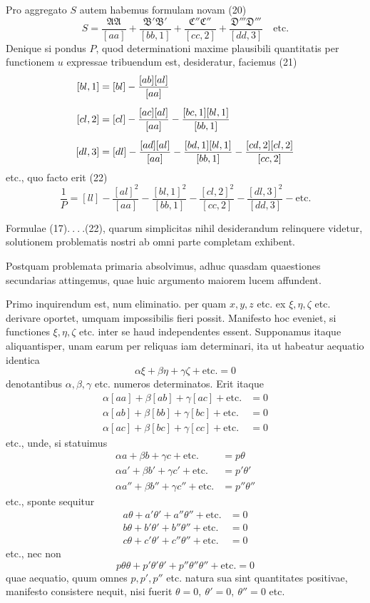 Pro aggregato \(S\) autem habemus formulam novam (20)
\[
S=\frac{\mathfrak A\mathfrak A}{[aa]}+\frac{\mathfrak B'\mathfrak B'}{[bb,1]}+\frac{\mathfrak C''\mathfrak C''}{[cc,2]}+\frac{\mathfrak D'''\mathfrak D'''}{[dd,3]}\quad\text{etc.}
\]
Denique si pondus \(P\), quod determinationi maxime plausibili quantitatis per functionem \(u\) expressae tribuendum est, desideratur, faciemus (21)
\[
\begin{aligned}\relax
[bl,1]&=[bl]-\frac{[ab][al]}{[aa]}\\[5pt]
[cl,2]&=[cl]-\frac{[ac][al]}{[aa]}-\frac{[bc,1][bl,1]}{[bb,1]}\\[5pt]
[dl,3]&=[dl]-\frac{[ad][al]}{[aa]}-\frac{[bd,1][bl,1]}{[bb,1]}-\frac{[cd,2][cl,2]}{[cc,2]}
\end{aligned}
\]
etc., quo facto erit (22)
\[
\frac1P=[ll]-\frac{[al]^2}{[aa]}-\frac{[bl,1]^2}{[bb,1]}-\frac{[cl,2]^2}{[cc,2]}-\frac{[dl,3]^2}{[dd,3]}-\text{etc.}
\]

Formulae (17)\(.\ .\ .\ .\)(22), quarum simplicitas nihil desiderandum relinquere videtur, solutionem problematis nostri ab omni parte completam exhibent.

Postquam problemata primaria absolvimus, adhuc quasdam quaestiones secundarias attingemus, quae huic argumento maiorem lucem affundent.

Primo inquirendum est, num eliminatio. per quam \(x,y,z\) etc. ex \(\xi,\eta,\zeta\) etc. derivare oportet, umquam impossibilis fieri possit. Manifesto hoc eveniet, si functiones \(\xi,\eta,\zeta\) etc. inter se haud independentes essent. Supponamus itaque aliquantisper, unam earum per reliquas iam determinari, ita ut habeatur aequatio identica
\[
\alpha\xi+\beta\eta+\gamma\zeta+\text{etc.}=0
\]
denotantibus \(\alpha,\beta,\gamma\) etc. numeros determinatos. Erit itaque
\[
\begin{aligned}
\alpha[aa]+\beta[ab]+\gamma[ac]+\text{etc.}&=0\\
\alpha[ab]+\beta[bb]+\gamma[bc]+\text{etc.}&=0\\
\alpha[ac]+\beta[bc]+\gamma[cc]+\text{etc.}&=0
\end{aligned}
\]
etc., unde, si statuimus
\[
\begin{aligned}
\alpha a+\beta b+\gamma c+\text{etc.}&=p\theta\\
\alpha a'+\beta b'+\gamma c'+\text{etc.}&=p'\theta'\\
\alpha a''+\beta b''+\gamma c''+\text{etc.}&=p''\theta''
\end{aligned}
\]
etc., sponte sequitur
\[
\begin{aligned}
a\theta+a'\theta'+a''\theta''+\text{etc.}&=0\\
b\theta+b'\theta'+b''\theta''+\text{etc.}&=0\\
c\theta+c'\theta'+c''\theta''+\text{etc.}&=0
\end{aligned}
\]
etc., nec non
\[
p\theta\theta+p'\theta'\theta'+p''\theta''\theta''+\text{etc.}=0
\]
quae aequatio, quum omnes \(p,p',p''\) etc. natura sua sint quantitates positivae, manifesto consistere nequit, nisi fuerit \(\theta=0,\ \theta'=0,\ \theta''=0\) etc.

